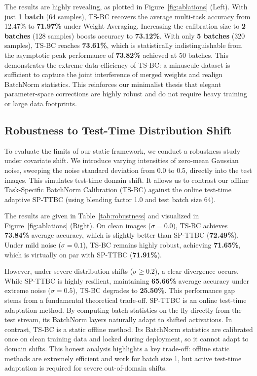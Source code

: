\documentclass{article}
\theoremstyle{plain}
\theoremstyle{definition}
\theoremstyle{remark}
\begin{document}
The results are highly revealing, as plotted in Figure~\ref{fig:ablations} (Left). With just \textbf{1 batch} (64 samples), TS-BC recovers the average multi-task accuracy from 12.47\% to \textbf{71.97\%} under Weight Averaging. Increasing the calibration size to \textbf{2 batches} (128 samples) boosts accuracy to \textbf{73.12\%}. With only \textbf{5 batches} (320 samples), TS-BC reaches \textbf{73.61\%}, which is statistically indistinguishable from the asymptotic peak performance of \textbf{73.82\%} achieved at 50 batches. This demonstrates the extreme data-efficiency of TS-BC: a minuscule dataset is sufficient to capture the joint interference of merged weights and realign BatchNorm statistics. This reinforces our minimalist thesis that elegant parameter-space corrections are highly robust and do not require heavy training or large data footprints.

\subsection{Robustness to Test-Time Distribution Shift}
To evaluate the limits of our static framework, we conduct a robustness study under covariate shift. We introduce varying intensities of zero-mean Gaussian noise, sweeping the noise standard deviation from 0.0 to 0.5, directly into the test images. This simulates test-time domain shift. It allows us to contrast our offline Task-Specific BatchNorm Calibration (TS-BC) against the online test-time adaptive SP-TTBC (using blending factor 1.0 and test batch size 64).

The results are given in Table~\ref{tab:robustness} and visualized in Figure~\ref{fig:ablations} (Right). On clean images ($\sigma = 0.0$), TS-BC achieves \textbf{73.84\%} average accuracy, which is slightly better than SP-TTBC (\textbf{72.49\%}). Under mild noise ($\sigma = 0.1$), TS-BC remains highly robust, achieving \textbf{71.65\%}, which is virtually on par with SP-TTBC (\textbf{71.91\%}). 

However, under severe distribution shifts ($\sigma \ge 0.2$), a clear divergence occurs. While SP-TTBC is highly resilient, maintaining \textbf{65.66\%} average accuracy under extreme noise ($\sigma = 0.5$), TS-BC degrades to \textbf{25.50\%}. This performance gap stems from a fundamental theoretical trade-off. SP-TTBC is an online test-time adaptation method. By computing batch statistics on the fly directly from the test stream, its BatchNorm layers naturally adapt to shifted activations. In contrast, TS-BC is a static offline method. Its BatchNorm statistics are calibrated once on clean training data and locked during deployment, so it cannot adapt to domain shifts. This honest analysis highlights a key trade-off: offline static methods are extremely efficient and work for batch size 1, but active test-time adaptation is required for severe out-of-domain shifts.
\end{document}
